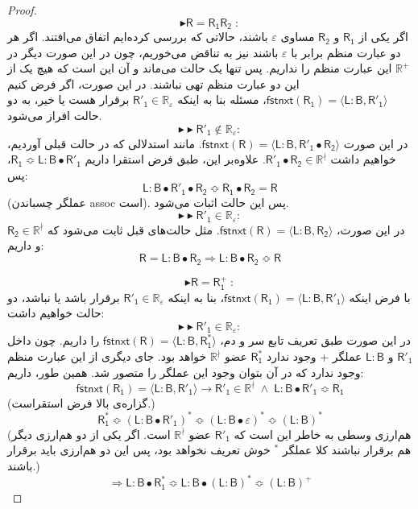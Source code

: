 \begin{proof}
	
	$$\blacktriangleright\mathsf{R=R_1 R_2\;:}$$
	اگر یکی از $\mathsf{R_1}$ و $\mathsf{R_2}$ مساوی $\varepsilon$ باشند، حالاتی که بررسی کرده‌ایم اتفاق می‌افتند. اگر هر دو عبارت منظم برابر با $\varepsilon$ باشند نیز به تناقض می‌خوریم، چون در این صورت دیگر در $\mathbb{R^+}$ این عبارت منظم را نداریم. پس تنها یک حالت می‌ماند و آن این است که هیچ یک از این دو عبارت منظم تهی نباشند. در این صورت، اگر فرض کنیم 
	$\mathsf{fstnxt(R_1)=\langle L:B , R'_1 \rangle}$،
	مسئله بنا به اینکه 
	$\mathsf{R'_1} \in \mathbb{R_\varepsilon}$
	برقرار هست یا خیر، به دو حالت افراز می‌شود.
	$$\blacktriangleright\blacktriangleright \mathsf{R'_1} \notin \mathbb{R_\varepsilon}: $$
	در این صورت 
	$\mathsf{fstnxt(R)=\langle L:B , R'_1 \bullet R_2}\rangle$.
	مانند استدلالی که در حالت قبلی آوردیم، خواهیم داشت 
	$\mathsf{R'_1 \bullet R_2 \in } \mathbb{R^\nmid}$.
	علاوه‌بر این، طبق فرض استقرا داریم 
	$\mathsf{ R_1 \Bumpeq L:B \bullet R'_1 }$،
	پس:
	$$\mathsf{L:B \bullet R'_1 \bullet R_2 \Bumpeq R_1 \bullet R_2 = R}$$
	(عملگر چسباندن \gls*{assoc} است). پس این حالت اثبات می‌شود.
	$$\blacktriangleright\blacktriangleright \mathsf{R'_1} \in \mathbb{R_\varepsilon}: $$
	در این صورت،
	$\mathsf{fstnxt(R)=\langle L:B , R_2 \rangle}$.
	مثل حالت‌های قبل ثابت می‌شود که $\mathsf{R_2} \in \mathbb{R^\nmid}$ و داریم:
	$$\mathsf{R = L:B \bullet R_2 \Rightarrow L:B \bullet R_2 \Bumpeq R}$$ 
	
	$$\blacktriangleright\mathsf{R=R_1^+\;:}$$
	با فرض اینکه 
	$\mathsf{fstnxt(R_1)=\langle L:B , R'_1 \rangle}$،
		بنا به اینکه 
	$\mathsf{R'_1} \in \mathbb{R_\varepsilon}$
	برقرار باشد یا نباشد، دو حالت خواهیم داشت:
	$$\blacktriangleright\blacktriangleright\mathsf{R'_1} \in \mathbb{R_\varepsilon}:$$
	در این صورت طبق تعریف تابع سر و دم،
	$\mathsf{fstnxt(R)=\langle L:B , R^*_1 \rangle}$
	را داریم. 
 چون  داخل 
	$\mathsf{R'_1}$
	و 
	$\mathsf{L:B}$
	عملگر $+$ وجود ندارد 	$\mathsf{R_1^*}$
	عضو 
	$\mathbb{R^\nmid}$ 
	خواهد بود. جای دیگری از این عبارت منظم وجود ندارد که در آن بتوان وجود این عملگر را متصور شد. همین طور، داریم:
	$$\mathsf{fstnxt(R_1) = \langle L:B , R'_1 \rangle \rightarrow
		R'_1 \in \mathbb{R^\nmid}\; \land \; L:B \bullet R'_1 \Bumpeq R_1}$$
		(گزاره‌ی بالا فرض استقراست.)
	$$\mathsf{R_1^* \Bumpeq (L:B \bullet R'_1)^* \Bumpeq (L:B \bullet \varepsilon)^* \Bumpeq (L:B)^*}$$
	(هم‌ارزی وسطی به خاطر این است که $\mathsf{R'_1}$ عضو $\mathbb{R^\nmid}$ است. اگر یکی از دو هم‌ارزی‌ دیگر هم برقرار نباشند کلا عملگر $ ^*$ خوش تعریف نخواهد بود، پس این دو هم‌ارزی باید برقرار باشند.)
	$$\Rightarrow \mathsf{L:B\bullet R_1^* \Bumpeq L:B \bullet (L:B)^* \Bumpeq 
	(L:B)^+}$$


\end{proof}
